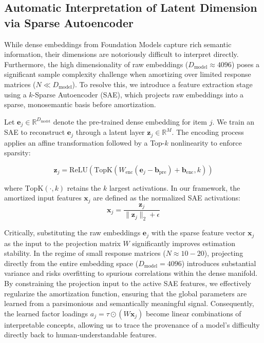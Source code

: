 \documentclass{article}
\theoremstyle{plain}
\theoremstyle{definition}
\theoremstyle{remark}
\begin{document}
\subsection{Automatic Interpretation of Latent Dimension via Sparse Autoencoder}
While dense embeddings from Foundation Models capture rich semantic information, their dimensions are notoriously difficult to interpret directly. Furthermore, the high dimensionality of raw embeddings ($D_{\text{model}} \approx 4096$) poses a significant sample complexity challenge when amortizing over limited response matrices ($N \ll D_{\text{model}}$). To resolve this, we introduce a feature extraction stage using a $k$-Sparse Autoencoder (SAE), which projects raw embeddings into a sparse, monosemantic basis before amortization.

Let $\mathbf{e}_j \in \mathbb{R}^{D_{\text{model}}}$ denote the pre-trained dense embedding for item $j$. We train an SAE to reconstruct $\mathbf{e}_j$ through a latent layer $\mathbf{z}_j \in \mathbb{R}^{M}$. The encoding process applies an affine transformation followed by a Top-$k$ nonlinearity to enforce sparsity:

\begin{equation}
    \mathbf{z}_j = \text{ReLU}(\text{TopK}(W_{\text{enc}}(\mathbf{e}_j - \mathbf{b}_{\text{pre}}) + \mathbf{b}_{\text{enc}}, k))
\end{equation}

where $\text{TopK}(\cdot, k)$ retains the $k$ largest activations. In our framework, the amortized input features $\mathbf{x}_j$ are defined as the normalized SAE activations:
\begin{equation}
    \mathbf{x}_j = \frac{\mathbf{z}_j}{\|\mathbf{z}_j\|_2 + \epsilon}
\end{equation}

Critically, substituting the raw embeddings $\mathbf{e}_j$ with the sparse feature vector $\mathbf{x}_j$ as the input to the projection matrix $W$ significantly improves estimation stability. In the regime of small response matrices ($N \approx 10-20$), projecting directly from the entire embedding space ($D_{\text{model}}=4096$) introduces substantial variance and risks overfitting to spurious correlations within the dense manifold. By constraining the projection input to the active SAE features, we effectively regularize the amortization function, ensuring that the global parameters are learned from a parsimonious and semantically meaningful signal. Consequently, the learned factor loadings $a_j = \tau \odot (W \mathbf{x}_j)$ become linear combinations of interpretable concepts, allowing us to trace the provenance of a model's difficulty directly back to human-understandable features.
\end{document}
